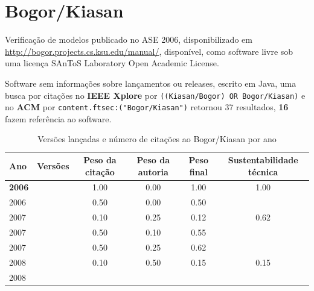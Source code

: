 \section{Bogor/Kiasan}

Verificação de modelos
publicado no ASE 2006,
disponibilizado em \url{http://bogor.projects.cs.ksu.edu/manual/},
disponível,
como software livre
sob uma licença SAnToS Laboratory Open Academic License.

Software sem informações sobre lançamentos ou releases,
escrito em Java,
uma busca por citações no {\bf IEEE Xplore} por
\texttt{((Kiasan/Bogor) OR Bogor/Kiasan)}
e no {\bf ACM} por
\texttt{content.ftsec:("Bogor/Kiasan")}
retornou
37 resultados,
{\bf 16} fazem referência ao software.


\begin{table}[H]
\caption{Versões lançadas e número de citações ao Bogor/Kiasan por ano}
\centering
\begin{tabular}{| l | c | c | c | c | c |}
  \hline
  Ano & Versões & Peso da citação & Peso da autoria & Peso final & Sustentabilidade técnica \\
  \hline
            {\bf 2006}
          &
          
          &
          1.00
          &
          0.00
          &
          1.00
          &
            {\color{blue} 1.00}
          \\
            2006
          &
          
          &
          0.50
          &
          0.00
          &
          0.50
          &
          \\
\hline
            2007
          &
          
          &
          0.10
          &
          0.25
          &
          0.12
          &
            {\color{blue} 0.62}
          \\
            2007
          &
          
          &
          0.50
          &
          0.10
          &
          0.55
          &
          \\
            2007
          &
          
          &
          0.50
          &
          0.25
          &
          0.62
          &
          \\
\hline
            2008
          &
          
          &
          0.10
          &
          0.50
          &
          0.15
          &
            {\color{red} 0.15}
          \\
            2008
          &
          

\end{tabular}
\end{table}
